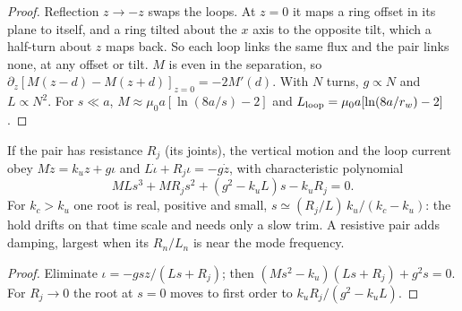\begin{proof}
Reflection $z\to-z$ swaps the loops. At $z=0$ it maps a ring offset in its plane to itself, and a ring tilted about the $x$ axis to the opposite
tilt, which a half-turn about $z$ maps back. So each loop links the same flux and the pair links none, at any offset or tilt. $M$ is even in the
separation, so $\partial_z[M(z-d)-M(z+d)]_{z=0}=-2M'(d)$. With $N$ turns, $g\propto N$ and $L\propto N^2$. For $s\ll a$,
$M\approx\mu_0a[\ln(8a/s)-2]$ and $L_{\rm loop}=\mu_0a[\ln(8a/r_w)-2]$.
\end{proof}
\begin{proposition}\label{prop:drift}
If the pair has resistance $R_j$ (its joints), the vertical motion and the loop current obey $M\ddot z=k_uz+g\iota$ and $L\dot\iota+R_j\iota=-g\dot z$,
with characteristic polynomial
\begin{equation}
MLs^3+MR_js^2+(g^2-k_uL)s-k_uR_j=0 .\label{eq:driftpoly}
\end{equation}
For $k_c>k_u$ one root is real, positive and small, $s\simeq(R_j/L)\,k_u/(k_c-k_u)$: the hold drifts on that time scale and needs only a slow
trim. A resistive pair adds damping, largest when its $R_n/L_n$ is near the mode frequency.
\end{proposition}
\begin{proof}
Eliminate $\iota=-gsz/(Ls+R_j)$; then $(Ms^2-k_u)(Ls+R_j)+g^2s=0$. For $R_j\to0$ the root at $s=0$ moves to first order to
$k_uR_j/(g^2-k_uL)$.
\end{proof}
